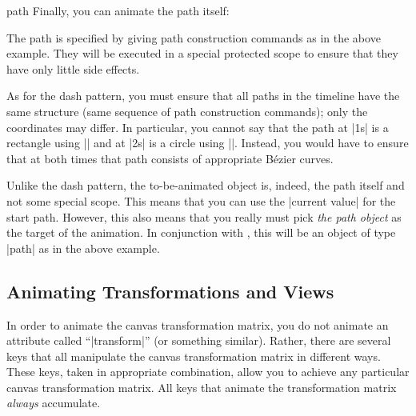 \begin{animateattribute}{path}
  Finally, you can animate the path itself:
\begin{codeexample}[animation list={0.5,1,1.5,2}]
\end{codeexample}
  The path is specified by giving path construction commands as in the
  above example. They will be executed in a special protected scope to
  ensure that they have only little side effects.

  As for the dash pattern, you must ensure that all paths in the
  timeline have the same structure (same sequence of path construction
  commands); only the coordinates may differ. In particular, you
  cannot say that the path at |1s| is a rectangle using
  |\pgfpathrectangle| and at |2s| is a circle using
  |\pgfpathcircle|. Instead, you would have to ensure that at both
  times that path consists of appropriate Bézier curves.

  Unlike the dash pattern, the to-be-animated object is, indeed, the
  path itself and not some special scope. This means that you can use
  the |current value| for the start path. However, this also means
  that you really must pick \emph{the path object} as the target of
  the animation. In conjunction with \tikzname, this will be an object
  of type |path| as in the above example.
\end{animateattribute}



\subsection{Animating Transformations  and Views}
\label{section-base-animation-views}


In order to animate the canvas transformation matrix, you do not
animate an attribute called ``|transform|'' (or something
similar). Rather, there are several keys that all manipulate the
canvas transformation matrix in different ways. These keys, taken in
appropriate combination, allow you to achieve any particular canvas
transformation matrix. All keys that animate the transformation matrix
\emph{always} accumulate.

